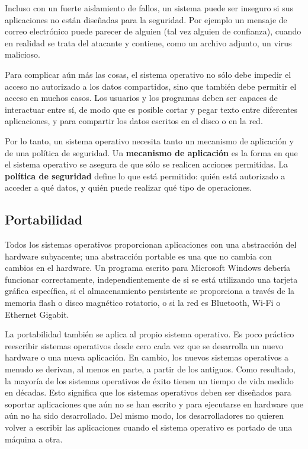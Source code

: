 \documentclass[10pt]{book}
\begin{document}
Incluso con un fuerte aislamiento de fallos, un sistema puede ser inseguro si sus aplicaciones no están diseñadas para la seguridad. Por ejemplo un mensaje de correo electrónico puede parecer de alguien (tal vez alguien de confianza), cuando en realidad se trata del atacante y contiene, como un archivo adjunto, un virus malicioso.

Para complicar aún más las cosas, el sistema operativo no sólo debe impedir el acceso no autorizado a los datos compartidos, sino que también debe permitir el acceso en muchos casos. Los usuarios y los programas deben ser capaces de interactuar entre sí, de modo que es posible cortar y pegar texto entre diferentes aplicaciones, y para compartir los datos escritos en el disco o en la red.

Por lo tanto, un sistema operativo necesita tanto un mecanismo de aplicación y de una política de seguridad. Un \textbf{mecanismo de aplicación} es la forma en que el sistema operativo se asegura de que sólo se realicen acciones permitidas. La \textbf{política de seguridad} define lo que está permitido: quién está autorizado a acceder a qué datos, y quién puede realizar qué tipo de operaciones.

\subsection{Portabilidad}
Todos los sistemas operativos proporcionan aplicaciones con una abstracción del hardware subyacente; una abstracción portable es una que no cambia con cambios en el hardware. Un programa escrito para Microsoft Windows debería funcionar correctamente, independientemente de si se está utilizando una tarjeta gráfica específica, si el almacenamiento persistente se proporciona a través de la memoria flash o disco magnético rotatorio, o si la red es Bluetooth, Wi-Fi o Ethernet Gigabit.

La portabilidad también se aplica al propio sistema operativo. Es poco práctico reescribir sistemas operativos desde cero cada vez que se desarrolla un nuevo hardware o una nueva aplicación. En cambio, los nuevos sistemas operativos a menudo se derivan, al menos en parte, a partir de los antiguos. Como resultado, la mayoría de los sistemas operativos de éxito tienen un tiempo de vida medido en décadas. Esto significa que los sistemas operativos deben ser diseñados para soportar aplicaciones que aún no se han escrito y para ejecutarse en hardware que aún no ha sido desarrollado. Del mismo modo, los desarrolladores no quieren volver a escribir las aplicaciones cuando el sistema operativo es portado de una máquina a otra.
\end{document}
